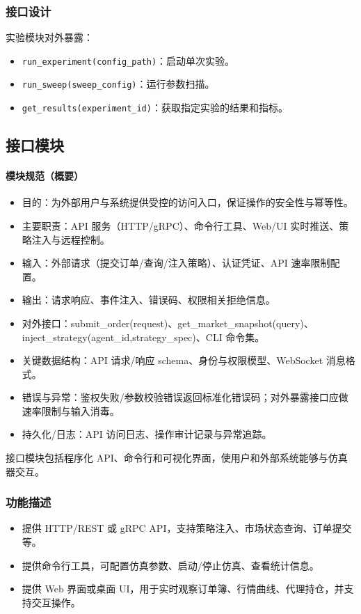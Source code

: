 \subsubsection{接口设计}
实验模块对外暴露：
\begin{itemize}
  \item \verb|run_experiment(config_path)|：启动单次实验。
  \item \verb|run_sweep(sweep_config)|：运行参数扫描。
  \item \verb|get_results(experiment_id)|：获取指定实验的结果和指标。
\end{itemize}

\subsection{接口模块}

\paragraph{模块规范（概要）}
\begin{itemize}
  \item 目的：为外部用户与系统提供受控的访问入口，保证操作的安全性与幂等性。
  \item 主要职责：API 服务（HTTP/gRPC）、命令行工具、Web/UI 实时推送、策略注入与远程控制。
  \item 输入：外部请求（提交订单/查询/注入策略）、认证凭证、API 速率限制配置。
  \item 输出：请求响应、事件注入、错误码、权限相关拒绝信息。
  \item 对外接口：submit\_order(request)、get\_market\_snapshot(query)、inject\_strategy(agent\_id,strategy\_spec)、CLI 命令集。
  \item 关键数据结构：API 请求/响应 schema、身份与权限模型、WebSocket 消息格式。
  \item 错误与异常：鉴权失败/参数校验错误返回标准化错误码；对外暴露接口应做速率限制与输入消毒。
  \item 持久化/日志：API 访问日志、操作审计记录与异常追踪。
\end{itemize}

接口模块包括程序化 API、命令行和可视化界面，使用户和外部系统能够与仿真器交互。

\subsubsection{功能描述}
\begin{itemize}
  \item 提供 HTTP/REST 或 gRPC API，支持策略注入、市场状态查询、订单提交等。
  \item 提供命令行工具，可配置仿真参数、启动/停止仿真、查看统计信息。
  \item 提供 Web 界面或桌面 UI，用于实时观察订单簿、行情曲线、代理持仓，并支持交互操作。
\end{itemize}

